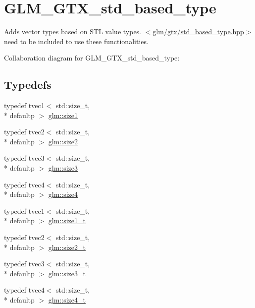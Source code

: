 \hypertarget{group__gtx__std__based__type}{\section{G\-L\-M\-\_\-\-G\-T\-X\-\_\-std\-\_\-based\-\_\-type}
\label{group__gtx__std__based__type}
}


Adds vector types based on S\-T\-L value types. $<$\hyperlink{std__based__type_8hpp}{glm/gtx/std\-\_\-based\-\_\-type.\-hpp}$>$ need to be included to use these functionalities.  


Collaboration diagram for G\-L\-M\-\_\-\-G\-T\-X\-\_\-std\-\_\-based\-\_\-type\-:
\subsection*{Typedefs}
\begin{DoxyCompactItemize}
\item 
typedef tvec1$<$ std\-::size\-\_\-t, \\*
defaultp $>$ \hyperlink{group__gtx__std__based__type_ga3550330d27cef40f7694130b501be73a}{glm\-::size1}
\item 
typedef tvec2$<$ std\-::size\-\_\-t, \\*
defaultp $>$ \hyperlink{group__gtx__std__based__type_gab8b434ee2ba109726915e977c6aca22a}{glm\-::size2}
\item 
typedef tvec3$<$ std\-::size\-\_\-t, \\*
defaultp $>$ \hyperlink{group__gtx__std__based__type_gacf3e47fc09ad812f100e13442919fc79}{glm\-::size3}
\item 
typedef tvec4$<$ std\-::size\-\_\-t, \\*
defaultp $>$ \hyperlink{group__gtx__std__based__type_ga66a39603f01a37444de3adb28c021e79}{glm\-::size4}
\item 
typedef tvec1$<$ std\-::size\-\_\-t, \\*
defaultp $>$ \hyperlink{group__gtx__std__based__type_ga9a9525491009d0df7bcc964b1e2e5745}{glm\-::size1\-\_\-t}
\item 
typedef tvec2$<$ std\-::size\-\_\-t, \\*
defaultp $>$ \hyperlink{group__gtx__std__based__type_ga47b1e2bca519b02eb8500a240216b5de}{glm\-::size2\-\_\-t}
\item 
typedef tvec3$<$ std\-::size\-\_\-t, \\*
defaultp $>$ \hyperlink{group__gtx__std__based__type_ga689991bc66c16637f043ade5cbb87260}{glm\-::size3\-\_\-t}
\item 
typedef tvec4$<$ std\-::size\-\_\-t, \\*
defaultp $>$ \hyperlink{group__gtx__std__based__type_gaa4f69cfac1c3e014a50fd090974092ec}{glm\-::size4\-\_\-t}
\end{DoxyCompactItemize}



